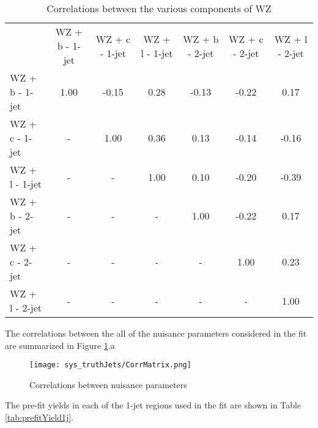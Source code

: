 \hspace{-1in}\begin{table}[H]
\begin{adjustwidth}{-3em}{-3em}
\begin{center}
\begin{tabular}{l|cccccc}
\hline
 & WZ + b - 1-jet & WZ + c - 1-jet & WZ + l - 1-jet & WZ + b - 2-jet & WZ + c - 2-jet & WZ + l - 2-jet\\
WZ + b - 1-jet & 1.00 & -0.15 & 0.28 & -0.13 & -0.22 & 0.17 \\
WZ + c - 1-jet & - & 1.00 & 0.36 & 0.13 & -0.14 & -0.16 \\
WZ + l - 1-jet & - & - & 1.00 & 0.10 & -0.20 & -0.39 \\
WZ + b - 2-jet & - & - & - & 1.00 & -0.22 & 0.17 \\
WZ + c - 2-jet & - & - & - & - & 1.00 & 0.23 \\
WZ + l - 2-jet & - & - & - & - & - & 1.00 \\
\hline
\end{tabular}
\caption{Correlations between the various components of WZ}
\label{tab:WZ_corr}
\end{center}
\end{adjustwidth}
\end{table}

The correlations between the all of the nuisance parameters considered in the fit are summarized in Figure \ref{fig:corr_mat_1j}.a

\begin{figure}[H]                                                                                                            
    \centering                                                                                                               
    \texttt{[image: sys\_truthJets/CorrMatrix.png]}
    \caption{Correlations between nuisance parameters}
    \label{fig:corr_mat_1j}
\end{figure}


The pre-fit yields in each of the 1-jet regions used in the fit are shown in Table \ref{tab:prefitYield1j}.

\hspace{-1in}\begin{table}[H]
\begin{adjustwidth}{-3em}{-3em}
\small

\label{tab:prefitYield1j}
\caption{Pre-fit yields in each of the 1-jet regions.}
\end{adjustwidth}
\end{table}

